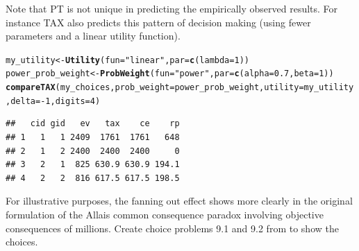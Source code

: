 \documentclass{article}\usepackage[]{graphicx}\usepackage[]{color}
\makeatletter
\newcommand{\hlnum}[1]{\textcolor[rgb]{0.686,0.059,0.569}{#1}}%
\newcommand{\hlstr}[1]{\textcolor[rgb]{0.192,0.494,0.8}{#1}}%
\newcommand{\hlopt}[1]{\textcolor[rgb]{0,0,0}{#1}}%
\newcommand{\hlstd}[1]{\textcolor[rgb]{0.345,0.345,0.345}{#1}}%
\newcommand{\hlkwb}[1]{\textcolor[rgb]{0.69,0.353,0.396}{#1}}%
\newcommand{\hlkwc}[1]{\textcolor[rgb]{0.333,0.667,0.333}{#1}}%
\newcommand{\hlkwd}[1]{\textcolor[rgb]{0.737,0.353,0.396}{\textbf{#1}}}%
\newenvironment{kframe}{%
 \def\at@end@of@kframe{}%
 \ifinner\ifhmode%
  \def\at@end@of@kframe{\end{minipage}}%
  \begin{minipage}{\columnwidth}%
 \fi\fi%
 \def\FrameCommand##1{\hskip\@totalleftmargin \hskip-\fboxsep
 \colorbox{shadecolor}{##1}\hskip-\fboxsep
     \hskip-\linewidth \hskip-\@totalleftmargin \hskip\columnwidth}%
 \MakeFramed {\advance\hsize-\width
   \@totalleftmargin\z@ \linewidth\hsize
   \@setminipage}}%
 {\par\unskip\endMakeFramed%
 \at@end@of@kframe}
\newenvironment{knitrout}{}{} %
\makeatother
\begin{document}
Note that PT is not unique in predicting the empirically observed results. For instance TAX also predicts this pattern of decision making (using fewer parameters and a linear utility function).

\begin{knitrout}
\color{fgcolor}\begin{kframe}
\begin{alltt}
\hlstd{my_utility} \hlkwb{<-} \hlkwd{Utility}\hlstd{(}\hlkwc{fun}\hlstd{=}\hlstr{"linear"}\hlstd{,} \hlkwc{par}\hlstd{=}\hlkwd{c}\hlstd{(}\hlkwc{lambda}\hlstd{=}\hlnum{1}\hlstd{))}
\hlstd{power_prob_weight} \hlkwb{<-} \hlkwd{ProbWeight}\hlstd{(}\hlkwc{fun}\hlstd{=}\hlstr{"power"}\hlstd{,} \hlkwc{par}\hlstd{=}\hlkwd{c}\hlstd{(}\hlkwc{alpha}\hlstd{=}\hlnum{0.7}\hlstd{,} \hlkwc{beta}\hlstd{=}\hlnum{1}\hlstd{))}
\hlkwd{compareTAX}\hlstd{(my_choices,} \hlkwc{prob_weight}\hlstd{=power_prob_weight,} \hlkwc{utility}\hlstd{=my_utility,} \hlkwc{delta}\hlstd{=}\hlopt{-}\hlnum{1}\hlstd{,} \hlkwc{digits}\hlstd{=}\hlnum{4}\hlstd{)}
\end{alltt}
\begin{verbatim}
##   cid gid   ev   tax    ce    rp
## 1   1   1 2409  1761  1761   648
## 2   1   2 2400  2400  2400     0
## 3   2   1  825 630.9 630.9 194.1
## 4   2   2  816 617.5 617.5 198.5
\end{verbatim}
\end{kframe}
\end{knitrout}


For illustrative purposes, the fanning out effect shows more clearly in the original formulation of the
Allais common consequence paradox involving objective consequences of millions. Create choice problems 9.1 and 9.2 from \citet[][Table 2 p. 480]{Birnbaum_2008}
to show the choices.
\end{document}
